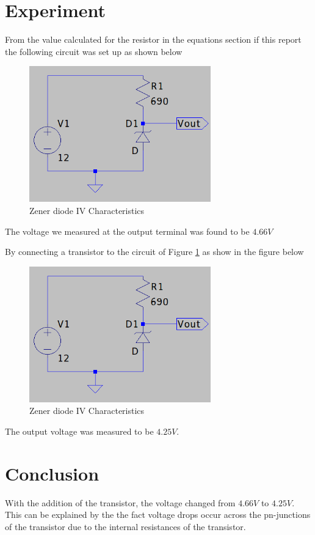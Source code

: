 \documentclass[12pt, a4paper]{article}
\begin{document}
	\section{Experiment} %
	\label{sec:experiment}
		From the value calculated for the resistor in the equations section if this report the following circuit was set up as shown below

		\begin{figure}[H]
			\centering
			\includegraphics[width=0.7\textwidth]{Images/Part_1_Experiment.png}
			\caption{Zener diode IV Characteristics}
			\label{fig:part_1_experiment}
		\end{figure}

		The voltage we measured at the output terminal was found to be $4.66V$

		By connecting a transistor to the circuit of Figure \ref{fig:part_1_experiment} as show in the figure below 

		\begin{figure}[H]
			\centering
			\includegraphics[width=0.7\textwidth]{Images/Part_2_Experiment.png}
			\caption{Zener diode IV Characteristics}
			\label{fig:part_2_experiment}
		\end{figure}

		The output voltage was measured to be $4.25V$. 
	

	\section{Conclusion} %
	\label{sec:conclusion}
		With the addition of the transistor, the voltage changed from $4.66V$ to $4.25V$. This can be explained by the the fact voltage drops occur across the pn-junctions of the transistor due to the internal resistances of the transistor.
	
\end{document}
